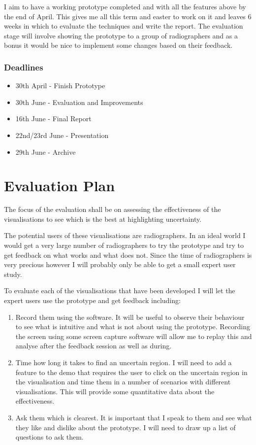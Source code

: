 \documentclass[
  oneside,
  11pt, a4paper,
  footinclude=true,
  headinclude=true,
  cleardoublepage=empty
]{scrbook}
\begin{document}
I aim to have a working prototype completed and with all the features above by the end of April. This gives me all this term and easter to work on it and leaves 6 weeks in which to evaluate the techniques and write the report. The evaluation stage will involve showing the prototype to a group of radiographers and as a bonus it would be nice to implement some changes based on their feedback.

\subsection*{Deadlines}
\begin{itemize}
	\item[] 30th April - Finish Prototype
	\item[] 30th June - Evaluation and Improvements
	\item[] 16th June - Final Report
	\item[] 22nd/23rd June - Presentation
	\item[] 29th June - Archive
\end{itemize}

\chapter{Evaluation Plan}
The focus of the evaluation shall be on assessing the effectiveness of the visualisations to see which is the best at highlighting uncertainty.

The potential users of these visualisations are radiographers. In an ideal world I would get a very large number of radiographers to try the prototype and try to get feedback on what works and what does not. Since the time of radiographers is very precious however I will probably only be able to get a small expert user study.

To evaluate each of the visualisations that have been developed I will let the expert users use the prototype and get feedback including:

\begin{enumerate}
\item Record them using the software. It will be useful to observe their behaviour to see what is intuitive and what is not about using the prototype. Recording the screen using some screen capture software will allow me to replay this and analyse after the feedback session as well as during.
\item Time how long it takes to find an uncertain region. I will need to add a feature to the demo that requires the user to click on the uncertain region in the visualisation and time them in a number of scenarios with different visualisations. This will provide some quantitative data about the effectiveness.
\item Ask them which is clearest. It is important that I speak to them and see what they like and dislike about the prototype. I will need to draw up a list of questions to ask them.
\end{enumerate}
\end{document}
